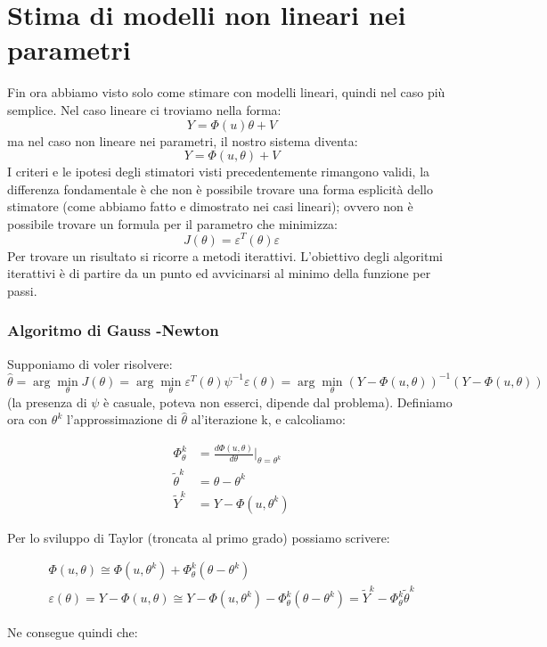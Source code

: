\section{Stima di modelli non lineari nei parametri}
Fin ora abbiamo visto solo come stimare con modelli lineari, quindi nel caso più semplice. Nel caso lineare ci troviamo nella forma:
  \[ Y=\Phi(u)\theta+V \]
ma nel caso non lineare nei parametri, il nostro sistema diventa:
  \[ Y=\Phi(u,\theta)+V \]
I criteri e le ipotesi degli stimatori visti precedentemente rimangono validi, la differenza fondamentale è che non è possibile trovare una forma esplicità dello stimatore (come abbiamo fatto e dimostrato nei casi lineari); ovvero non è possibile trovare un formula per il parametro che minimizza:
\[ J(\theta)=\varepsilon^T(\theta)\varepsilon \]
Per trovare un risultato si ricorre a metodi iterattivi. L'obiettivo degli algoritmi iterattivi è di partire da un punto ed avvicinarsi al minimo della funzione per passi.
\subsubsection{Algoritmo di Gauss -Newton}
Supponiamo di voler risolvere:
\[ \hat{\theta}=\arg \min_{\theta} J(\theta)=\arg \min_{\theta} \varepsilon^T(\theta)\psi^{-1}\varepsilon(\theta)=\arg \min_{\theta} (Y-\Phi(u,\theta))^{-1}(Y-\Phi(u,\theta)) \]
(la presenza di $\psi$ è casuale, poteva non esserci, dipende dal problema). Definiamo ora con $\theta^k$ l'approssimazione di $\hat{\theta}$ al'iterazione k, e calcoliamo:

  \begin{align*}
    \Phi_\theta^k&={\frac{d\Phi(u,\theta)}{d\theta}}|_{\theta=\theta^k}\\
    \tilde{\theta}^k&=\theta-\theta^k\\
    \widetilde{Y}^k&=Y-\Phi(u,\theta^k) 
  \end{align*}
  
Per lo sviluppo di Taylor (troncata al primo grado) possiamo scrivere:

  \begin{gather*}
    \Phi(u,\theta) \cong \Phi(u,\theta^k) + \Phi_\theta^k(\theta-\theta^k)\\
    \varepsilon(\theta) = Y-\Phi(u,\theta) \cong Y-\Phi(u,\theta^k) - \Phi_\theta^k(\theta-\theta^k)=\widetilde{Y}^k-\Phi_\theta^k\tilde{\theta}^k
  \end{gather*}
  
Ne consegue quindi che:

